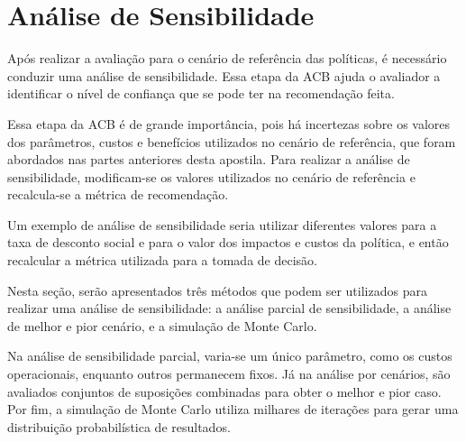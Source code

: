 \documentclass[12pt,letterpaper]{article}
\newcommand{\1}{\mathbbm{1}}
\numberwithin{equation}{section}
\begin{document}





\section{Análise de Sensibilidade}

Após realizar a avaliação para o cenário de referência das políticas, é necessário conduzir uma análise de sensibilidade. Essa etapa da ACB ajuda o avaliador a identificar o nível de confiança que se pode ter na recomendação feita.

Essa etapa da ACB é de grande importância, pois há incertezas sobre os valores dos parâmetros, custos e benefícios utilizados no cenário de referência, que foram abordados nas partes anteriores desta apostila. Para realizar a análise de sensibilidade, modificam-se os valores utilizados no cenário de referência e recalcula-se a métrica de recomendação.

Um exemplo de análise de sensibilidade seria utilizar diferentes valores para a taxa de desconto social e para o valor dos impactos e custos da política, e então recalcular a métrica utilizada para a tomada de decisão.

Nesta seção, serão apresentados três métodos que podem ser utilizados para realizar uma análise de sensibilidade: a análise parcial de sensibilidade, a análise de melhor e pior cenário, e a simulação de Monte Carlo.

Na análise de sensibilidade parcial, varia-se um único parâmetro, como os custos operacionais, enquanto outros permanecem fixos. Já na análise por cenários, são avaliados conjuntos de suposições combinadas para obter o melhor e pior caso. Por fim, a simulação de Monte Carlo utiliza milhares de iterações para gerar uma distribuição probabilística de resultados.
\end{document}
